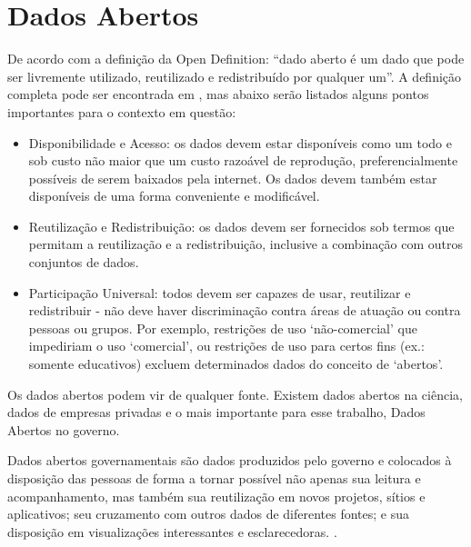 \chapter{Dados Abertos}

De acordo com a definição da Open Definition: “dado aberto é um dado que pode ser livremente utilizado, reutilizado e redistribuído por qualquer um”. A definição completa pode ser encontrada em \cite{open}, mas abaixo serão listados alguns pontos importantes para o contexto em questão:
\begin{itemize}
	\item Disponibilidade e Acesso: os dados devem estar disponíveis como um todo e sob custo não maior que um custo razoável de reprodução, preferencialmente possíveis de serem baixados pela internet. Os dados devem também estar disponíveis de uma forma conveniente e modificável.
	\item Reutilização e Redistribuição: os dados devem ser fornecidos sob termos que permitam a reutilização e a redistribuição, inclusive a combinação com outros conjuntos de dados.
	\item Participação Universal: todos devem ser capazes de usar, reutilizar e redistribuir - não deve haver discriminação contra áreas de atuação ou contra pessoas ou grupos. Por exemplo, restrições de uso ‘não-comercial’ que impediriam o uso ‘comercial’, ou restrições de uso para certos fins (ex.: somente educativos) excluem determinados dados do conceito de ‘abertos’.
\end{itemize}

Os dados abertos podem vir de qualquer fonte. Existem dados abertos na ciência, dados de empresas privadas e o mais importante para esse trabalho, Dados Abertos no governo.

Dados abertos governamentais são dados produzidos pelo governo e colocados à disposição das pessoas de forma a tornar possível não apenas sua leitura e acompanhamento, mas também sua reutilização em novos projetos, sítios e aplicativos; seu cruzamento com outros dados de diferentes fontes; e sua disposição em visualizações interessantes e esclarecedoras. \cite{manual}.

